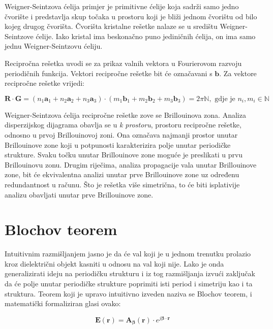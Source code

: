 \documentclass[utf8, seminar]{fer}
\begin{document}
Weigner-Seintzova ćelija primjer je primitivne ćelije koja sadrži samo jedno
čvorište i predstavlja skup točaka u prostoru koji je bliži jednom čvorištu
od bilo kojeg drugog čvorišta. Čvorišta kristalne rešetke nalaze se u središtu
Weigner-Seintzove ćelije. Iako kristal ima beskonačno puno jediničnih ćelija,
on ima samo jednu Weigner-Seintzovu ćeliju.

Recipročna rešetka uvodi se za prikaz valnih vektora u Fourierovom razvoju
periodičnih funkcija. Vektori recipročne rešetke bit će označavani s $\mathbf{b}$.
Za vektore recipročne rešetke vrijedi:

\begin{equation}
	\mathbf{R} \cdot \mathbf{G} =
	(n_1\mathbf{a}_1 + n_2\mathbf{a}_2 + n_3\mathbf{a}_3)
	\cdot
	(m_1\mathbf{b}_1 + m_2\mathbf{b}_2 + m_3\mathbf{b}_3) = 2 \pi \mathbb{N},
		\text{ gdje je }n_i, m_i \in \mathbb{N}
\end{equation}


Weigner-Seintzova ćelija recipročne rešetke zove se Brillouinova zona. Analiza
disperzijskog dijagrama obavlja se u \textit{k prostoru}, prostoru recipročne
rešetke, odnosno u prvoj Brillouinovoj zoni. Ona označava najmanji
prostor unutar Brillouinove zone koji u potpunosti karakterizira polje unutar
periodičke strukture. Svaku točku unutar Brillouinove zone moguće je preslikati
u prvu Brillouinovu zonu. Drugim riječima, analiza propagacije vala unutar
Brillouinove zone, bit će ekvivalentna analizi unutar prve Brillouinove zone uz
određenu redundantnost u računu. Što je rešetka više simetrična, to će biti
isplativije analizu obavljati unutar prve Brillouinove zone.


\section{Blochov teorem}

Intuitivnim razmišljanjem jasno je da će val koji je u jednom trenutku prolazio
kroz dielektrični objekt kasniti u odnosu na val koji nije. Lako je onda
generalizirati ideju na periodičku strukturu i iz tog razmišljanja izvući
zaključak da će polje unutar periodičke strukture poprimiti isti period i
simetriju kao i ta struktura. Teorem koji je upravo intuitivno izveden naziva se
Blochov teorem, i matematički formaliziran glasi ovako:

\begin{equation} \label{eq:bloch}
	\mathbf{E}(\mathbf{r}) =
	\mathbf{A}_\mathbf{\beta}(\mathbf{r}) \cdot
		e^{j \mathbf{\beta} \cdot \mathbf{r}}
\end{equation}
\end{document}
